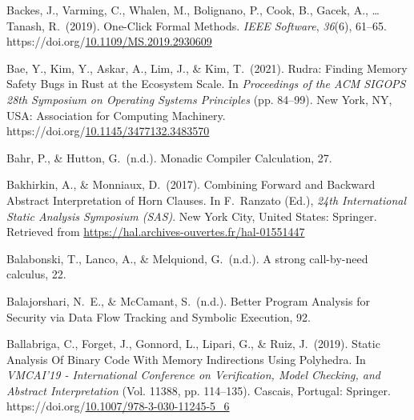\documentclass[12pt,twoside]{article}
\begin{document}
{\begin{thebibliography}{1079}
\mdbibitemlabel{}Backes, J., Varming, C., Whalen, M., Bolignano, P., Cook, B., Gacek, A., … Tanash, R.~(2019). One-Click Formal Methods. \emph{IEEE Software}, \emph{36}(6), 61–65. https://doi.org/\href{https://dx.doi.org/10.1109/MS.2019.2930609}{10.1109/MS.2019.2930609}%

\mdbibitemlabel{}Bae, Y., Kim, Y., Askar, A., Lim, J., \& Kim, T.~(2021). Rudra: Finding Memory Safety Bugs in Rust at the Ecosystem Scale. In \emph{Proceedings of the ACM SIGOPS 28th Symposium on Operating Systems Principles} (pp. 84–99). New York, NY, USA: Association for Computing Machinery. https://doi.org/\href{https://dx.doi.org/10.1145/3477132.3483570}{10.1145/3477132.3483570}%

\mdbibitemlabel{}Bahr, P., \& Hutton, G.~(n.d.). Monadic Compiler Calculation, 27.%

\mdbibitemlabel{}Bakhirkin, A., \& Monniaux, D.~(2017). Combining Forward and Backward Abstract Interpretation of Horn Clauses. In F.~Ranzato (Ed.), \emph{24th International Static Analysis Symposium (SAS)}. New York City, United States: Springer. Retrieved from \href{https://hal.archives-ouvertes.fr/hal-01551447}{{\ttfamily https://\hspace{0pt}hal.\hspace{0pt}archives-\hspace{0pt}ouvertes.\hspace{0pt}fr/\hspace{0pt}hal-\hspace{0pt}01551447}}%

\mdbibitemlabel{}Balabonski, T., Lanco, A., \& Melquiond, G.~(n.d.). A strong call-by-need calculus, 22.%

\mdbibitemlabel{}Balajorshari, N.~E., \& McCamant, S.~(n.d.). Better Program Analysis for Security via Data Flow Tracking and Symbolic Execution, 92.%

\mdbibitemlabel{}Ballabriga, C., Forget, J., Gonnord, L., Lipari, G., \& Ruiz, J.~(2019). Static Analysis Of Binary Code With Memory Indirections Using Polyhedra. In \emph{VMCAI’19 - International Conference on Verification, Model Checking, and Abstract Interpretation} (Vol. 11388, pp. 114–135). Cascais, Portugal: Springer. https://doi.org/\href{https://dx.doi.org/10.1007/978-3-030-11245-5_6}{10.1007/978-3-030-11245-5\_6}%


\end{thebibliography}}
\end{document}
